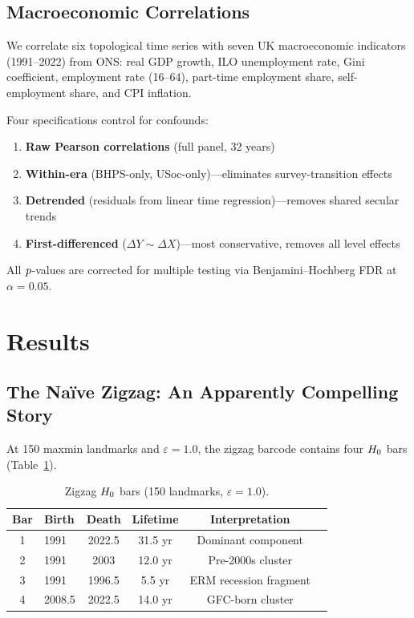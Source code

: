 \subsection{Macroeconomic Correlations}

We correlate six topological time series with seven UK macroeconomic indicators
(1991--2022) from ONS: real GDP growth, ILO unemployment rate, Gini coefficient,
employment rate (16--64), part-time employment share, self-employment share, and
CPI inflation.

Four specifications control for confounds:
\begin{enumerate}
  \item \textbf{Raw Pearson correlations} (full panel, 32 years)
  \item \textbf{Within-era} (BHPS-only, USoc-only)---eliminates
    survey-transition effects
  \item \textbf{Detrended} (residuals from linear time regression)---removes
    shared secular trends
  \item \textbf{First-differenced} ($\Delta Y \sim \Delta X$)---most
    conservative, removes all level effects
\end{enumerate}
All $\textit{p}$-values are corrected for multiple testing via Benjamini--Hochberg
FDR at $\alpha = 0.05$.

\section{Results}
\label{sec:results}

\subsection{The Na\"{i}ve Zigzag: An Apparently Compelling Story}
\label{sec:naive}

At 150 maxmin landmarks and $\varepsilon = 1.0$, the zigzag barcode contains four
$H_{0}$ bars (Table~\ref{tab:zigzag_bars}).

\begin{table}[htbp]
  \centering
  \caption{Zigzag $H_{0}$ bars (150 landmarks, $\varepsilon = 1.0$).}
  \label{tab:zigzag_bars}
  \begin{tabular}{clcccp{5cm}}
    \toprule
    Bar & Birth & Death & Lifetime & Interpretation \\
    \midrule
    1 & 1991   & 2022.5 & 31.5 yr & Dominant component \\
    2 & 1991   & 2003   & 12.0 yr & Pre-2000s cluster \\
    3 & 1991   & 1996.5 &  5.5 yr & ERM recession fragment \\
    4 & 2008.5 & 2022.5 & 14.0 yr & GFC-born cluster \\
    \bottomrule
  \end{tabular}
\end{table}

